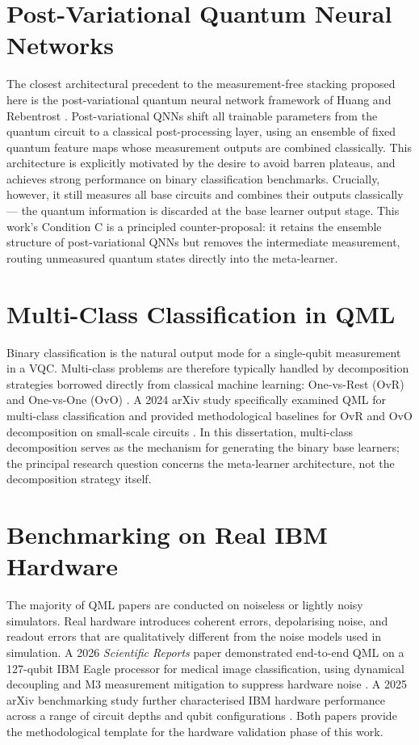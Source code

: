 \documentclass[]{UCD_CS_FYP_Report}
\begin{document}
\section{Post-Variational Quantum Neural Networks}

The closest architectural precedent to the measurement-free stacking proposed here is the post-variational quantum neural network framework of Huang and Rebentrost \cite{huang2023postvariational}. Post-variational QNNs shift all trainable parameters from the quantum circuit to a classical post-processing layer, using an ensemble of fixed quantum feature maps whose measurement outputs are combined classically. This architecture is explicitly motivated by the desire to avoid barren plateaus, and achieves strong performance on binary classification benchmarks. Crucially, however, it still measures all base circuits and combines their outputs classically --- the quantum information is discarded at the base learner output stage. This work's Condition C is a principled counter-proposal: it retains the ensemble structure of post-variational QNNs but removes the intermediate measurement, routing unmeasured quantum states directly into the meta-learner.

\section{Multi-Class Classification in QML}

Binary classification is the natural output mode for a single-qubit measurement in a VQC. Multi-class problems are therefore typically handled by decomposition strategies borrowed directly from classical machine learning: One-vs-Rest (OvR) and One-vs-One (OvO) \cite{rath2022multiclass}. A 2024 arXiv study specifically examined QML for multi-class classification and provided methodological baselines for OvR and OvO decomposition on small-scale circuits \cite{qmlmulticlass2024}. In this dissertation, multi-class decomposition serves as the mechanism for generating the binary base learners; the principal research question concerns the meta-learner architecture, not the decomposition strategy itself.

\section{Benchmarking on Real IBM Hardware}

The majority of QML papers are conducted on noiseless or lightly noisy simulators. Real hardware introduces coherent errors, depolarising noise, and readout errors that are qualitatively different from the noise models used in simulation. A 2026 \textit{Scientific Reports} paper demonstrated end-to-end QML on a 127-qubit IBM Eagle processor for medical image classification, using dynamical decoupling and M3 measurement mitigation to suppress hardware noise \cite{medmnist2026ibm}. A 2025 arXiv benchmarking study further characterised IBM hardware performance across a range of circuit depths and qubit configurations \cite{ibmbenchmark2025}. Both papers provide the methodological template for the hardware validation phase of this work.
\end{document}
